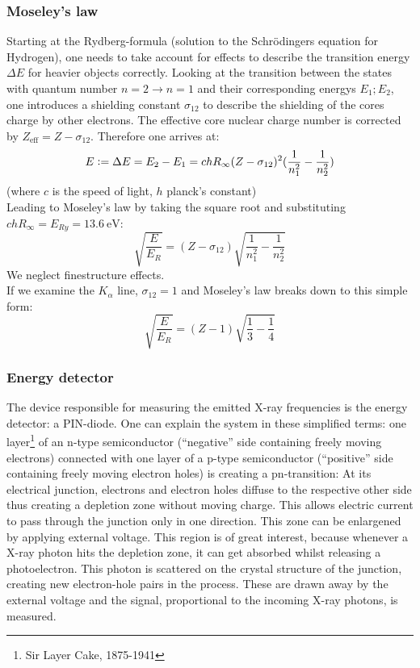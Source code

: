 \subsubsection{Moseley's law}
Starting at the Rydberg-formula (solution to the Schrödingers equation for Hydrogen), one needs to take account for effects to describe the transition energy \(\Delta E\) for heavier objects correctly. Looking at the transition between the states with quantum number \(n=2\to n=1\) and their corresponding energys \(E_1;E_2\), one introduces a shielding constant \(\sigma_{12}\) to describe the shielding of the cores charge by other electrons. The effective core nuclear charge number is corrected by \(Z_\text{eff}=Z-\sigma_{12}\). Therefore one arrives at:
\begin{equation}
    E\vcentcolon=\Delta E=E_2-E_1=chR_\infty(Z-\sigma_{12})^2(\frac{1}{n_1^2}-\frac{1}{n_2^2})
\end{equation}
(where \(c\) is the speed of light, \(h\) planck's constant)\\
Leading to Moseley's law by taking the square root and substituting \(chR_\infty=E_{Ry}=\qty{13.6}{\electronvolt}\):
\begin{equation}
    \sqrt{\frac{E}{E_R}}=(Z-\sigma_{12})\sqrt{\frac{1}{n_1^2}-\frac{1}{n_2^2}}
    \label{eq:Moseleyslaw}
\end{equation}
We neglect finestructure effects.\\
If we examine the \(K_\alpha\) line, \(\sigma_{12}=1\) and Moseley's law breaks down to this simple form:
\begin{equation}
        \sqrt{\frac{E}{E_R}}=(Z-1)\sqrt{\frac{1}{3}-\frac{1}{4}}
        \label{eq:Moseleyslaw_alpha}
\end{equation}

\subsubsection{Energy detector}
The device responsible for measuring the emitted X-ray frequencies is the energy detector: a PIN-diode. One can explain the system in these simplified terms: one layer\footnote{Sir Layer Cake, 1875-1941} of an n-type semiconductor (\enquote{negative} side containing freely moving electrons) connected with one layer of a p-type semiconductor (\enquote{positive} side containing freely moving electron holes) is creating a pn-transition: At its electrical junction, electrons and electron holes diffuse to the respective other side thus creating a depletion zone without moving charge. This allows electric current to pass through the junction only in one direction. This zone can be enlargened by applying external voltage. This region is of great interest, because whenever a X-ray photon hits the depletion zone, it can get absorbed whilst releasing a photoelectron. This photon is scattered on the crystal structure of the junction, creating new electron-hole pairs in the process. These are drawn away by the external voltage and the signal, proportional to the incoming X-ray photons, is measured.

